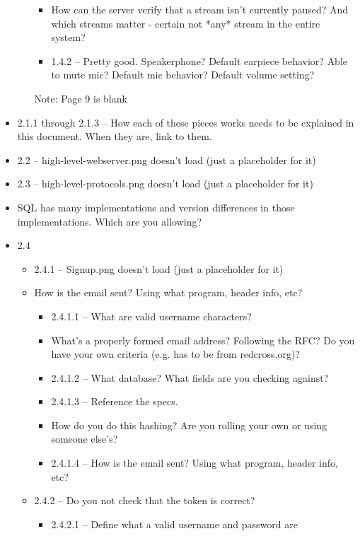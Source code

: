 \documentclass{article}
\begin{document}
\begin{itemize}
\begin{itemize}
\begin{itemize}
            \item How can the server verify that a stream isn't currently paused?  And which streams matter - certain not *any* stream in the entire system?
            \item 1.4.2 -- Pretty good.  Speakerphone?  Default earpiece behavior?  Able to mute mic?  Default mic behavior?  Default volume setting?
        \end{itemize}
        Note:  Page 9 is blank
    \end{itemize}
    \item 2.1.1 through 2.1.3 -- How each of these pieces works needs to be explained in this document.  When they are, link to them.
    \item 2.2 -- high-level-webserver.png doesn't load (just a placeholder for it)
    \item 2.3 -- high-level-protocols.png doesn't load (just a placeholder for it)
    \item SQL has many implementations and version differences in those implementations.  Which are you allowing?
    \item 2.4
    \begin{itemize}
        \item 2.4.1 -- Signup.png doesn't load (just a placeholder for it)
        \item How is the email sent?  Using what program, header info, etc?
        \begin{itemize}
            \item 2.4.1.1 -- What are valid username characters?  
            \item What's a properly formed email address?  Following the RFC?  Do you have your own criteria (e.g. has to be from redcross.org)?
            \item 2.4.1.2 -- What database?  What fields are you checking against?
            \item 2.4.1.3 -- Reference the specs.
            \item How do you do this hashing?  Are you rolling your own or using someone else's?
            \item 2.4.1.4 -- How is the email sent?  Using what program, header info, etc?
        \end{itemize}
        \item 2.4.2 -- Do you not check that the token is correct?
        \begin{itemize}
            \item 2.4.2.1 -- Define what a valid username and password are

\end{itemize}
\end{itemize}
\end{itemize}
\end{document}
